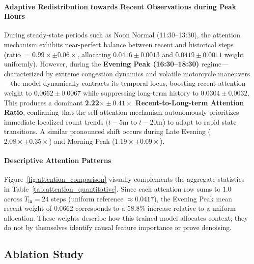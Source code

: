 \documentclass[a4paper,fleqn]{cas-sc}
\begin{document}
\paragraph{Adaptive Redistribution towards Recent Observations during Peak Hours} During steady-state periods such as Noon Normal (11:30--13:30), the attention mechanism exhibits near-perfect balance between recent and historical steps (ratio $= 0.99\times \pm 0.06\times$, allocating $0.0416 \pm 0.0013$ and $0.0419 \pm 0.0011$ weight uniformly). However, during the \textbf{Evening Peak (16:30--18:30)} regime—characterized by extreme congestion dynamics and volatile motorcycle maneuvers—the model dynamically contracts its temporal focus, boosting recent attention weight to $0.0662 \pm 0.0067$ while suppressing long-term history to $0.0304 \pm 0.0032$. This produces a dominant \textbf{2.22$\times \pm 0.41\times$ Recent-to-Long-term Attention Ratio}, confirming that the self-attention mechanism autonomously prioritizes immediate localized count trends ($t-5\text{m}$ to $t-20\text{m}$) to adapt to rapid state transitions. A similar pronounced shift occurs during Late Evening ($2.08\times \pm 0.35\times$) and Morning Peak ($1.19\times \pm 0.09\times$).

\paragraph{Descriptive Attention Patterns} Figure~\ref{fig:attention_comparison} visually complements the aggregate statistics in Table~\ref{tab:attention_quantitative}. Since each attention row sums to $1.0$ across $T_{\text{in}} = 24$ steps (uniform reference $\approx 0.0417$), the Evening Peak mean recent weight of $0.0662$ corresponds to a $58.8\%$ increase relative to a uniform allocation. These weights describe how this trained model allocates context; they do not by themselves identify causal feature importance or prove denoising.

\subsection{Ablation Study}
\end{document}

